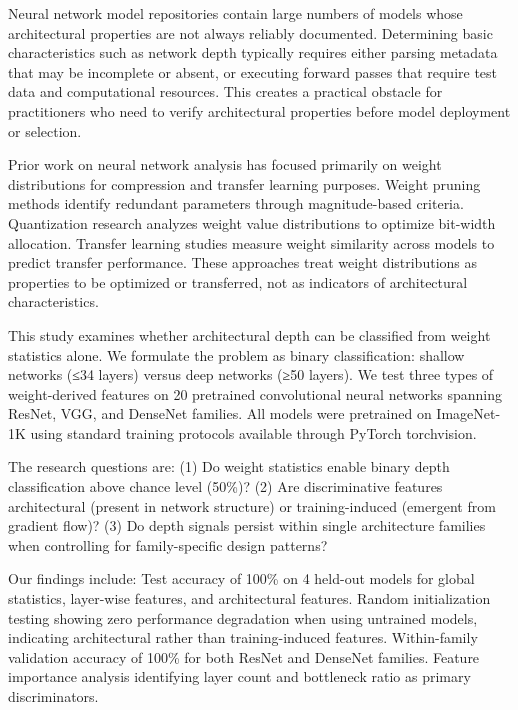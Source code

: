 
Neural network model repositories contain large numbers of models whose architectural properties are not always reliably documented. Determining basic characteristics such as network depth typically requires either parsing metadata that may be incomplete or absent, or executing forward passes that require test data and computational resources. This creates a practical obstacle for practitioners who need to verify architectural properties before model deployment or selection.

Prior work on neural network analysis has focused primarily on weight distributions for compression and transfer learning purposes. Weight pruning methods identify redundant parameters through magnitude-based criteria. Quantization research analyzes weight value distributions to optimize bit-width allocation. Transfer learning studies measure weight similarity across models to predict transfer performance. These approaches treat weight distributions as properties to be optimized or transferred, not as indicators of architectural characteristics.

This study examines whether architectural depth can be classified from weight statistics alone. We formulate the problem as binary classification: shallow networks (≤34 layers) versus deep networks (≥50 layers). We test three types of weight-derived features on 20 pretrained convolutional neural networks spanning ResNet, VGG, and DenseNet families. All models were pretrained on ImageNet-1K using standard training protocols available through PyTorch torchvision.

The research questions are: (1) Do weight statistics enable binary depth classification above chance level (50\%)? (2) Are discriminative features architectural (present in network structure) or training-induced (emergent from gradient flow)? (3) Do depth signals persist within single architecture families when controlling for family-specific design patterns?

Our findings include: Test accuracy of 100\% on 4 held-out models for global statistics, layer-wise features, and architectural features. Random initialization testing showing zero performance degradation when using untrained models, indicating architectural rather than training-induced features. Within-family validation accuracy of 100\% for both ResNet and DenseNet families. Feature importance analysis identifying layer count and bottleneck ratio as primary discriminators.
